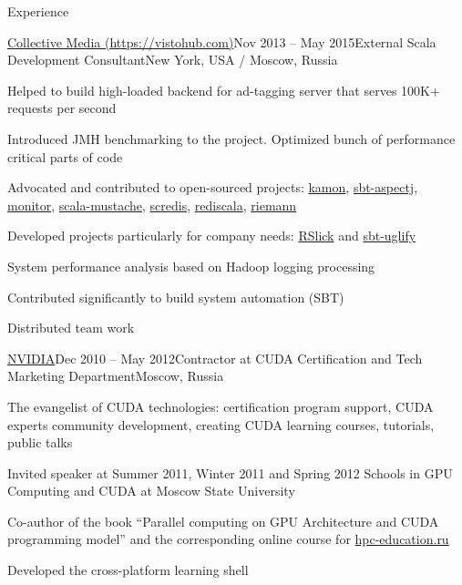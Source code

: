 \documentclass{resume} %
\begin{document}
\begin{rSection}{Experience}
\begin{rSubsection}{\href{https://www.vistohub.com/}{Collective Media
(https://vistohub.com)}}{Nov 2013 -- May 2015}{External Scala Development Consultant}{New
York, USA / Moscow, Russia}
\item Helped to build high-loaded backend for ad-tagging server that serves 100K+ requests per
second
\item Introduced JMH benchmarking to the project. Optimized bunch of performance critical parts of
code
\item Advocated and contributed to open-sourced projects:
\href{https://github.com/kamon-io/Kamon}{kamon},
\href{https://github.com/sbt/sbt-aspectj}{sbt-aspectj},
\href{https://github.com/eigengo/monitor}{monitor},
\href{https://github.com/vspy/scala-mustache}{scala-mustache},
\href{https://github.com/Livestream/scredis}{scredis},
\href{https://github.com/etaty/rediscala}{rediscala},
\href{https://github.com/aphyr/riemann}{riemann}
\item Developed projects particularly for company needs:
\href{http://github.com/alexander-myltsev/RSlick}{RSlick} and
\href{http://github.com/alexander-myltsev/sbt-uglify}{sbt-uglify}
\item System performance analysis based on Hadoop logging processing
\item Contributed significantly to build system automation (SBT)
\item Distributed team work
\end{rSubsection}


\begin{rSubsection}{\href{http://nvidia.ru}{NVIDIA}}{Dec 2010 -- May 2012}{Contractor at CUDA
Certification and Tech Marketing Department}{Moscow, Russia}
\item The evangelist of CUDA technologies: certification program support, CUDA experts community
development, creating CUDA learning courses, tutorials, public talks
\item Invited speaker at Summer 2011, Winter 2011 and Spring 2012 Schools in GPU Computing and CUDA at Moscow State University
\item Co-author of the book ``Parallel computing on GPU Architecture and CUDA programming model'' and the corresponding online course for \href{http://hpc-education.ru}{hpc-education.ru}
\item Developed the cross-platform learning shell
\end{rSubsection}

\end{rSection}
\end{document}
